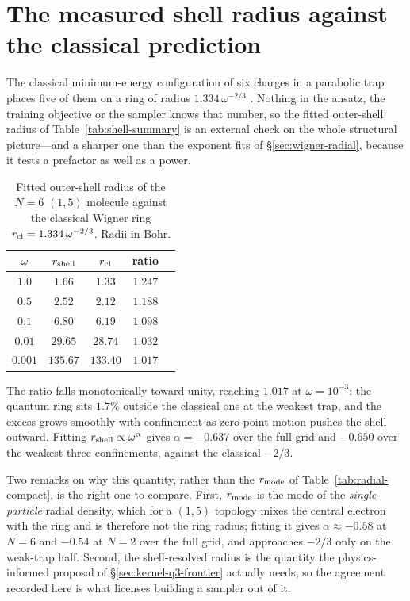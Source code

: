 \section{The measured shell radius against the classical prediction}
\label{app:structural-tables:radius}

The classical minimum-energy configuration of six charges in a parabolic trap places five
of them on a ring of radius $1.334\,\omega^{-2/3}$
\cite{schweigert1994spectralpropertieschargedparticles,Kong_2002}. Nothing in the ansatz,
the training objective or the sampler knows that number, so the fitted outer-shell radius of
Table~\ref{tab:shell-summary} is an external check on the whole structural picture---and a
sharper one than the exponent fits of \S\ref{sec:wigner-radial}, because it tests a
prefactor as well as a power.

\begin{table}[H]
\centering
\caption[Measured shell radius against the classical prediction]{Fitted outer-shell radius of the $N{=}6$ $(1,5)$ molecule against the classical
Wigner ring $r_{\rm cl}=1.334\,\omega^{-2/3}$. Radii in Bohr.}
\label{tab:classical-radius}
\begin{tabular}{ccccc}
\toprule
$\omega$ & $r_{\rm shell}$ & $r_{\rm cl}$ & ratio \\
\midrule
$1.0$   & $1.66$   & $1.33$   & $1.247$ \\
$0.5$   & $2.52$   & $2.12$   & $1.188$ \\
$0.1$   & $6.80$   & $6.19$   & $1.098$ \\
$0.01$  & $29.65$  & $28.74$  & $1.032$ \\
$0.001$ & $135.67$ & $133.40$ & $1.017$ \\
\bottomrule
\end{tabular}
\end{table}

The ratio falls monotonically toward unity, reaching $1.017$ at $\omega=10^{-3}$: the
quantum ring sits $1.7\%$ outside the classical one at the weakest trap, and the excess
grows smoothly with confinement as zero-point motion pushes the shell outward. Fitting
$r_{\rm shell}\propto\omega^{\alpha}$ gives $\alpha=-0.637$ over the full grid and $-0.650$
over the weakest three confinements, against the classical $-2/3$.

Two remarks on why this quantity, rather than the $r_{\rm mode}$ of
Table~\ref{tab:radial-compact}, is the right one to compare. First, $r_{\rm mode}$ is the
mode of the \emph{single-particle} radial density, which for a $(1,5)$ topology mixes the
central electron with the ring and is therefore not the ring radius; fitting it gives
$\alpha\approx-0.58$ at $N{=}6$ and $-0.54$ at $N{=}2$ over the full grid, and approaches
$-2/3$ only on the weak-trap half. Second, the shell-resolved radius is the quantity the
physics-informed proposal of \S\ref{sec:kernel-q3-frontier} actually needs, so the agreement
recorded here is what licenses building a sampler out of it.

